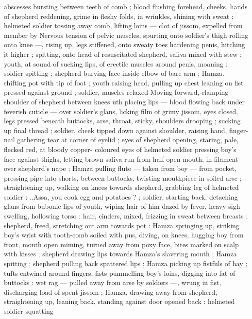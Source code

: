 abscesses bursting between teeth of comb ; blood flushing 
forehead, cheeks, hands of shepherd reddening, grime in fleshy 
folds, in wrinkles, shining with sweat ; helmeted soldier tossing away 
comb, lifting loins --- clot of jissom, expelled from member by 
Nervous tension of pelvic muscles, spurting onto soldier's thigh 
rolling onto knee ---, rising up, legs stiffened, onto sweaty toes 
hardening penis, hitching it higher ; spitting, onto head of 
resuscitated shepherd, saliva mixed with stew ; youth, at sound of 
sucking lips, of erectile muscles around penis, moaning : soldier 
spitting ; shepherd burying face inside elbow of bare arm ; Hamza. 
shifting pot with tip of foot ; youth raising head, pulling up chest 
leaning on fist pressed against ground ; soldier, muscles relaxed 
Moving forward, clamping shoulder of shepherd between knees 
uth placing lips --- blood flowing back under feverish cuticle --- 
over soldier's glans, licking film of grimy jissom, eyes closed, legs 
pressed beneath buttocks, arse, throat, sticky, shoulders drooping ; 
sucking up final thread ; soldier, cheek tipped down against shoulder, 
raising hand, finger-nail gathering tear at corner of eyelid ; eyes of 
shepherd opening, staring, pale, flecked red, at bloody copper- 
coloured eyes of helmeted soldier pressing boy's face against 
thighs, letting brown saliva run from half-open mouth, in filament 
over shepherd's nape ; Hamza pulling flute --- taken from boy --- 
from pocket, pressing pipe into shorts, between buttocks, twisting 
mouthpiece in soiled arse ; straightening up, walking on knees 
towards shepherd, grabbing leg of helmeted soldier : {\gl}..Assa, you 
cook egg and potatoes ? {\gr} ; soldier, starting back, detaching glans 
from bubonic lips of youth, wiping hair of him dazed by fever, heavy 
sigh swelling, hollowing torso : hair, cinders, mixed, frizzing in sweat 
between breasts ; shepherd, freed, stretching out arm towards pot : 
Hamza springing up, striking boy's wrist with tooth-comb soiled with 
pus, diving, on knees, hugging boy from front, mouth open miming, 
turned away from poxy face, bites marked on scalp with kisses ; 
shepherd drawing lips towards Hamza's slavering mouth ; Hamza 
spitting ; shepherd pulling back spattered lips ; Hamza picking up 
fistfuls of hay ; tufts entwined around fingers, fists pummelling boy's 
loins, digging into fat of buttocks : wet rag --- pulled away from arse 
by soldiers ---, wrung in fist, discharging load of spent jissom ; 
Hamza, drawing away from shepherd, straightening up, leaning back, 
standing against door opened back : helmeted soldier squatting 
